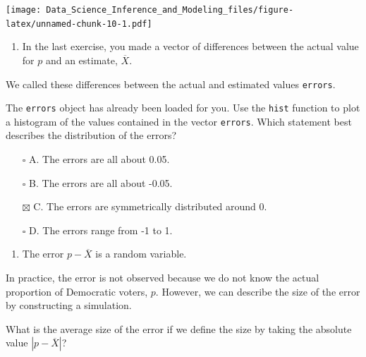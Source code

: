 \documentclass[
]{article}
\providecommand{\tightlist}{%
  \setlength{\itemsep}{0pt}\setlength{\parskip}{0pt}}
\begin{document}
\texttt{[image: Data\_Science\_Inference\_and\_Modeling\_files/figure-latex/unnamed-chunk-10-1.pdf]}

\begin{enumerate}
\def\labelenumi{\arabic{enumi}.}
\setcounter{enumi}{2}
\tightlist
\item
  In the last exercise, you made a vector of differences between the
  actual value for \(p\) and an estimate, \(\overline{X}\).
\end{enumerate}

We called these differences between the actual and estimated values
\texttt{errors}.

The \texttt{errors} object has already been loaded for you. Use the
\texttt{hist} function to plot a histogram of the values contained in
the vector \texttt{errors}. Which statement best describes the
distribution of the errors?

\begin{itemize}
\tightlist
\item[$\square$]
  A. The errors are all about 0.05.
\item[$\square$]
  B. The errors are all about -0.05.
\item[$\boxtimes$]
  C. The errors are symmetrically distributed around 0.
\item[$\square$]
  D. The errors range from -1 to 1.
\end{itemize}

\begin{enumerate}
\def\labelenumi{\arabic{enumi}.}
\setcounter{enumi}{3}
\tightlist
\item
  The error \(p - \overline{X}\) is a random variable.
\end{enumerate}

In practice, the error is not observed because we do not know the actual
proportion of Democratic voters, \(p\). However, we can describe the
size of the error by constructing a simulation.

What is the average size of the error if we define the size by taking
the absolute value \(|p - \overline{X}|\)?
\end{document}
